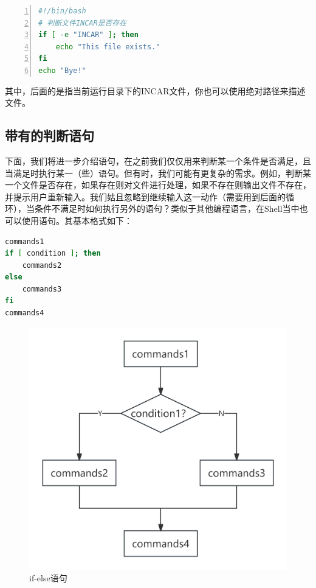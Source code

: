\begin{lstlisting}[language=bash,caption=file\_exist,numbers=left]
#!/bin/bash
# 判断文件INCAR是否存在
if [ -e "INCAR" ]; then
    echo "This file exists."
fi
echo "Bye!"
\end{lstlisting}

其中，后面的是指当前运行目录下的INCAR文件，你也可以使用绝对路径来描述文件。

\subsection{带有的判断语句}\label{subsec:判断语句-带有else的判断语句}

下面，我们将进一步介绍语句，在之前我们仅仅用来判断某一个条件是否满足，且当满足时执行某一（些）语句。但有时，我们可能有更复杂的需求。例如，判断某一个文件是否存在，如果存在则对文件进行处理，如果不存在则输出文件不存在，并提示用户重新输入。我们姑且忽略到继续输入这一动作（需要用到后面的循环），当条件不满足时如何执行另外的语句？类似于其他编程语言，在Shell当中也可以使用语句。其基本格式如下：

\begin{lstlisting}[language=bash]
commands1
if [ condition ]; then
    commands2
else
    commands3
fi
commands4
\end{lstlisting}

\begin{figure}
    \centering
    \includegraphics[width=1\linewidth]{Linux基础/Shell脚本基础/判断语句/fig/if-else语句.png}
    \caption{if-else语句}
    \label{fig:判断语句-if-else语句}
\end{figure}


